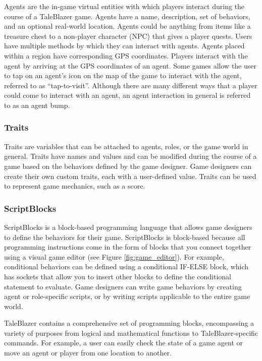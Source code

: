 Agents are the in-game virtual entities with which players interact during the course of a TaleBlazer game. Agents have a name, description, set of behaviors, and an optional real-world location. Agents could be anything from items like a treasure chest to a non-player character (NPC) that gives a player quests. Users have multiple methods by which they can interact with agents. Agents placed within a region have corresponding GPS coordinates. Players interact with the agent by arriving at the GPS coordinates of an agent. Some games allow the user to tap on an agent's icon on the map of the game to interact with the agent, referred to as ``tap-to-visit''. Although there are many different ways that a player could come to interact with an agent, an agent interaction in general is referred to as an agent bump.

\subsubsection{Traits}

Traits are variables that can be attached to agents, roles, or the game world in general. Traits have names and values and can be modified during the course of a game based on the behaviors defined by the game designer. Game designers can create their own custom traits, each with a user-defined value. Traits can be used to represent game mechanics, such as a score.

\subsubsection{ScriptBlocks}

ScriptBlocks is a block-based programming language that allows game designers to define the behaviors for their game. ScriptBlocks is block-based because all programming instructions come in the form of blocks that you connect together using a visual game editor (see Figure \ref{fig:game_editor}). For example, conditional behaviors can be defined using a conditional IF-ELSE block, which has sockets that allow you to insert other blocks to define the conditional statement to evaluate. Game designers can write game behaviors by creating agent or role-specific scripts, or by writing scripts applicable to the entire game world. 

TaleBlazer contains a comprehensive set of programming blocks, encompassing a variety of purposes from logical and mathematical functions to TaleBlazer-specific commands. For example, a user can easily check the state of a game agent or move an agent or player from one location to another.

